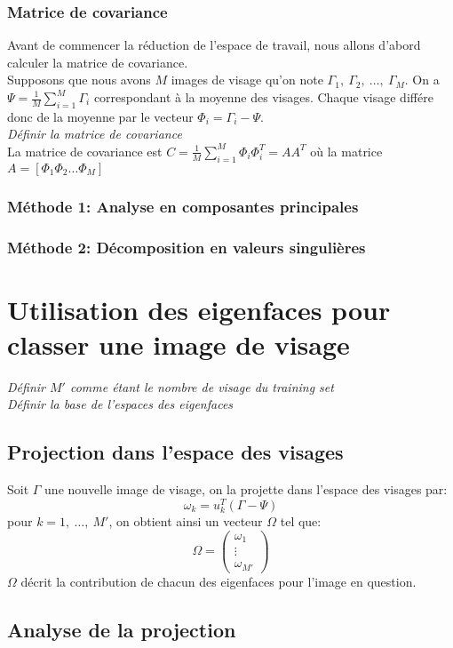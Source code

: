 \documentclass[12pt,french]{article}
\begin{document}
\subsubsection{Matrice de covariance}
Avant de commencer la réduction de l'espace de travail, nous allons d'abord calculer la matrice de covariance.\\
Supposons que nous avons $M$ images de visage qu'on note $\Gamma_1,~\Gamma_2,~\dots,~\Gamma_M$. On a $\Psi = \frac{1}{M}\displaystyle\sum_{i=1}^{M} \Gamma_i$ correspondant à la moyenne des visages.
Chaque visage différe donc de la moyenne par le vecteur $\Phi_i = \Gamma_i - \Psi$.
\\ \emph{Définir la matrice de covariance}\\
La matrice de covariance est $C = \frac{1}{M}\displaystyle\sum_{i=1}^{M} \Phi_i \Phi_i^T=AA^T$ où la matrice $A = [\Phi_1 \Phi_2 \dots \Phi_M]$

\subsubsection{Méthode 1: Analyse en composantes principales}
\subsubsection{Méthode 2: Décomposition en valeurs singulières}
\section{Utilisation des eigenfaces pour classer une image de visage}
\emph{Définir $M'$ comme étant le nombre de visage du training set}\\
\emph{Définir la base de l'espaces des eigenfaces}

\subsection{Projection dans l'espace des visages}
Soit $\Gamma$ une nouvelle image de visage, on la projette dans l'espace des visages par:
$$\omega_k = u_k^T(\Gamma - \Psi)$$
pour $k = 1,~\dots,~M'$, on obtient ainsi un vecteur $\Omega$ tel que:
\[\Omega =
\begin{pmatrix}
  \omega_1 \\
  \vdots \\
  \omega_{M'}
\end{pmatrix}
\]
$\Omega$ décrit la contribution de chacun des eigenfaces pour l'image en question.

\subsection{Analyse de la projection}
\end{document}
